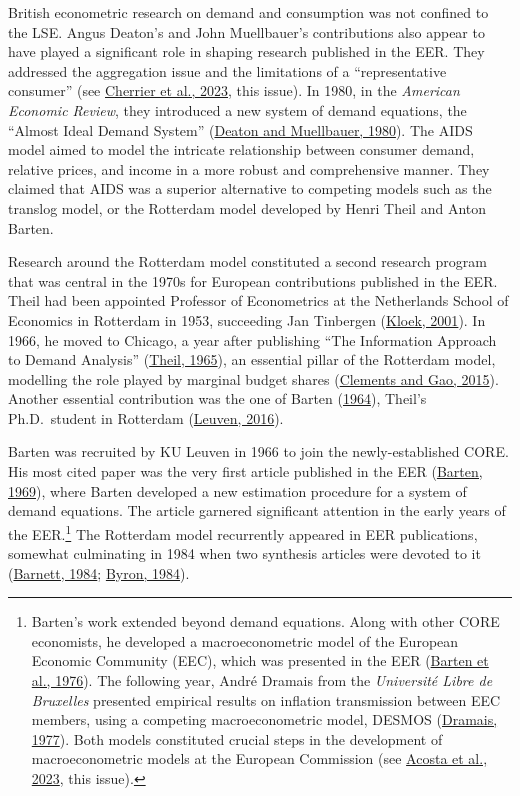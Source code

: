 \documentclass[
  12pt,
  onecolumn]{article}
\begin{document}
British econometric research on demand and consumption was not confined to the LSE. Angus Deaton's and John Muellbauer's contributions also appear to have played a significant role in shaping research published in the EER. They addressed the aggregation issue and the limitations of a ``representative consumer'' (see \protect\hyperlink{ref-cherrier2023}{Cherrier et al., 2023}, this issue). In 1980, in the \emph{American Economic Review}, they introduced a new system of demand equations, the ``Almost Ideal Demand System'' (\protect\hyperlink{ref-deaton1980}{Deaton and Muellbauer, 1980}). The AIDS model aimed to model the intricate relationship between consumer demand, relative prices, and income in a more robust and comprehensive manner. They claimed that AIDS was a superior alternative to competing models such as the translog model, or the Rotterdam model developed by Henri Theil and Anton Barten.

Research around the Rotterdam model constituted a second research program that was central in the 1970s for European contributions published in the EER. Theil had been appointed Professor of Econometrics at the Netherlands School of Economics in Rotterdam in 1953, succeeding Jan Tinbergen (\protect\hyperlink{ref-kloek2001}{Kloek, 2001}). In 1966, he moved to Chicago, a year after publishing ``The Information Approach to Demand Analysis'' (\protect\hyperlink{ref-theil1965}{Theil, 1965}), an essential pillar of the Rotterdam model, modelling the role played by marginal budget shares (\protect\hyperlink{ref-clements2015a}{Clements and Gao, 2015}). Another essential contribution was the one of Barten (\protect\hyperlink{ref-barten1964}{1964}), Theil's Ph.D.~student in Rotterdam (\protect\hyperlink{ref-kuleuven2016}{Leuven, 2016}).

Barten was recruited by KU Leuven in 1966 to join the newly-established CORE. His most cited paper was the very first article published in the EER (\protect\hyperlink{ref-barten1969}{Barten, 1969}), where Barten developed a new estimation procedure for a system of demand equations. The article garnered significant attention in the early years of the EER.\footnote{Barten's work extended beyond demand equations. Along with other CORE economists, he developed a macroeconometric model of the European Economic Community (EEC), which was presented in the EER (\protect\hyperlink{ref-barten1976}{Barten et al., 1976}). The following year, André Dramais from the \emph{Université Libre de Bruxelles} presented empirical results on inflation transmission between EEC members, using a competing macroeconometric model, DESMOS (\protect\hyperlink{ref-dramais1977}{Dramais, 1977}). Both models constituted crucial steps in the development of macroeconometric models at the European Commission (see \protect\hyperlink{ref-acosta2023a}{Acosta et al., 2023}, this issue).} The Rotterdam model recurrently appeared in EER publications, somewhat culminating in 1984 when two synthesis articles were devoted to it (\protect\hyperlink{ref-barnett1984}{Barnett, 1984}; \protect\hyperlink{ref-byron1984}{Byron, 1984}).
\end{document}
